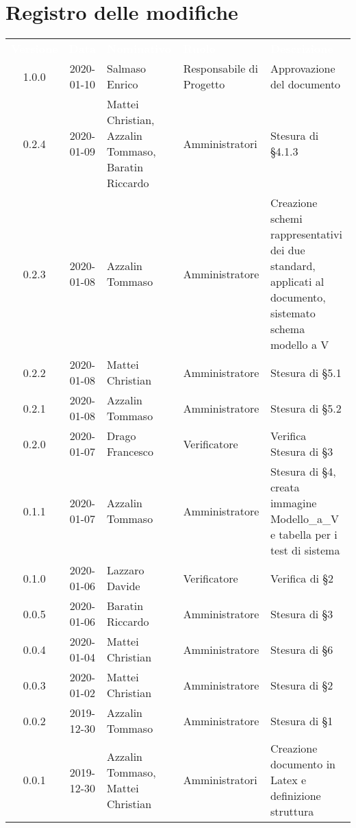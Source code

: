 \section*{Registro delle modifiche}
{
\renewcommand{\arraystretch}{1.5}
\centering
\begin{longtable}{ c c  C{4cm}  C{3cm} C{4cm}}
\textcolor{white}{\textbf{Versione}} & \textcolor{white}{\textbf{Data}} & \textcolor{white}{\textbf{Nominativo}} & \textcolor{white}{\textbf{Ruolo}} & \textcolor{white}{\textbf{Descrizione}}\\	

1.0.0 & 2020-01-10 & Salmaso Enrico & Responsabile di Progetto & Approvazione del documento \\	

0.2.4 & 2020-01-09 & Mattei Christian, Azzalin Tommaso, Baratin Riccardo & Amministratori & Stesura di §4.1.3 \\
0.2.3 & 2020-01-08 & Azzalin Tommaso & Amministratore & Creazione schemi rappresentativi dei due standard, applicati al documento, sistemato schema modello a V \\
0.2.2 & 2020-01-08 & Mattei Christian & Amministratore & Stesura di §5.1 \\
0.2.1 & 2020-01-08 & Azzalin Tommaso & Amministratore & Stesura di §5.2 \\
0.2.0 & 2020-01-07 & Drago Francesco & Verificatore & Verifica Stesura di §3 \\
0.1.1 & 2020-01-07 & Azzalin Tommaso & Amministratore & Stesura di §4, creata immagine Modello\_a\_V e tabella per i test di sistema \\
0.1.0 & 2020-01-06 & Lazzaro Davide & Verificatore & Verifica di §2 \\
0.0.5 & 2020-01-06 & Baratin Riccardo & Amministratore & Stesura di §3 \\
0.0.4 & 2020-01-04 & Mattei Christian & Amministratore & Stesura di §6 \\
0.0.3 & 2020-01-02 & Mattei Christian & Amministratore & Stesura di §2 \\
0.0.2 & 2019-12-30 & Azzalin Tommaso & Amministratore & Stesura di §1 \\
0.0.1 & 2019-12-30 & Azzalin Tommaso, Mattei Christian & Amministratori & Creazione documento in Latex e definizione struttura \\	
		
\end{longtable}
}
